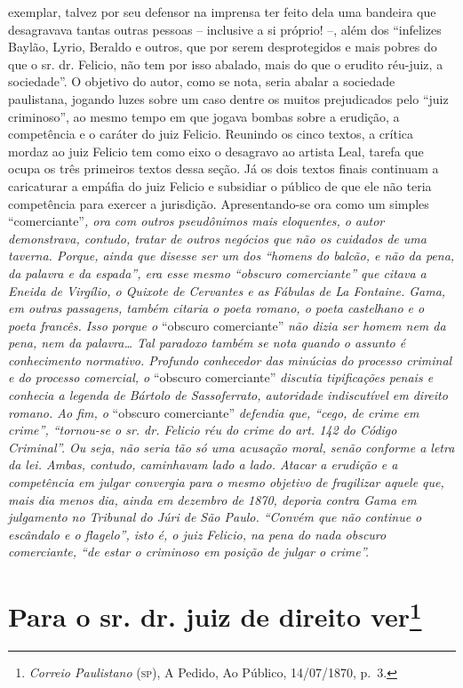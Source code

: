 \begin{argumento}
{exemplar, talvez por seu defensor na imprensa ter feito dela uma
bandeira que desagravava tantas outras pessoas -- inclusive a si
próprio! --, além dos ``infelizes Baylão, Lyrio, Beraldo e outros, que
por serem desprotegidos e mais pobres do que o sr. dr. Felicio, não tem
por isso abalado, mais do que o erudito réu-juiz, a sociedade''. O
objetivo do autor, como se nota, seria abalar a sociedade paulistana,
jogando luzes sobre um caso dentre os muitos prejudicados pelo ``juiz
criminoso'', ao mesmo tempo em que jogava bombas sobre a erudição, a
competência e o caráter do juiz Felicio. Reunindo os cinco textos, a
crítica mordaz ao juiz Felicio tem como eixo o desagravo ao artista
Leal, tarefa que ocupa os três primeiros textos dessa seção. Já os dois
textos finais continuam a caricaturar a empáfia do juiz Felicio e
subsidiar o público de que ele não teria competência para exercer a
jurisdição. Apresentando-se ora como um simples} ``comerciante''\emph{,
ora com outros pseudônimos mais eloquentes, o autor demonstrava,
contudo, tratar de outros negócios que não os cuidados de uma taverna.
Porque, ainda que disesse ser um dos ``homens do balcão, e não da pena,
da palavra e da espada'', era esse mesmo ``obscuro comerciante'' que citava
a Eneida de Virgílio, o Quixote de Cervantes e as Fábulas de La
Fontaine. Gama, em outras passagens, também citaria o poeta romano, o
poeta castelhano e o poeta francês. Isso porque o} ``obscuro comerciante''
\emph{não dizia ser homem nem da pena, nem da palavra\ldots{} Tal paradoxo
também se nota quando o assunto é conhecimento normativo. Profundo
conhecedor das minúcias do processo criminal e do processo comercial, o}
``obscuro comerciante'' \emph{discutia tipificações penais e conhecia a
legenda de Bártolo de Sassoferrato, autoridade indiscutível em direito
romano. Ao fim, o} ``obscuro comerciante'' \emph{defendia que, ``cego, de
crime em crime'', ``tornou-se o sr. dr. Felicio réu do crime do art. 142
do Código Criminal''. Ou seja, não seria tão só uma acusação moral, senão
conforme a letra da lei. Ambas, contudo, caminhavam lado a lado. Atacar
a erudição e a competência em julgar convergia para o mesmo objetivo de
fragilizar aquele que, mais dia menos dia, ainda em dezembro de 1870,
deporia contra Gama em julgamento no Tribunal do Júri de São Paulo.
``Convém que não continue o escândalo e o flagelo'', isto é, o juiz
Felicio, na pena do nada obscuro comerciante, ``de estar o criminoso em
posição de julgar o crime''.}
\end{argumento}

\chapter{Para o sr. dr. juiz de direito ver\footnote{\emph{Correio Paulistano} (\textsc{sp}), A Pedido, Ao Público,
  14/07/1870, p.~3.}} %

